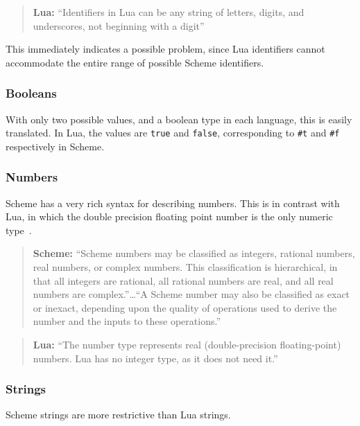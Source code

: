 \begin{quote}\textbf{Lua:}
``Identifiers in Lua can be any string of letters, digits, and
underscores, not beginning with a digit''~\cite[p.5]{luabook}
\end{quote}

This immediately indicates a possible problem, since Lua identifiers cannot
accommodate the entire range of possible Scheme identifiers.

\subsubsection{Booleans}

With only two possible values, and a boolean type in each language, this is
easily translated. In Lua, the values are \texttt{true} and \texttt{false},
corresponding to \texttt{\#t} and \texttt{\#f} respectively in Scheme.

\subsubsection{Numbers}

Scheme has a very rich syntax for describing numbers. This is in contrast with
Lua, in which the double precision floating point number is the only
numeric type~\cite[p.10]{luabook}.

\begin{quote}\textbf{Scheme:}
``Scheme numbers may be classified as integers, rational numbers, real numbers,
or complex numbers. This classification is hierarchical, in that all integers
are rational, all rational numbers are real, and all real numbers are
complex.''\ldots ``A Scheme number may also be classified as exact or inexact,
depending upon the quality of operations used to derive the number and the
inputs to these operations.''~\cite[Sec~6.4]{tspl}
\end{quote}

\begin{quote}\textbf{Lua:}
``The number type represents real (double-precision floating-point) numbers. Lua
has no integer type, as it does not need it.''~\cite[p.10]{luabook}
\end{quote}

\subsubsection{Strings}

Scheme strings are more restrictive than Lua strings.

